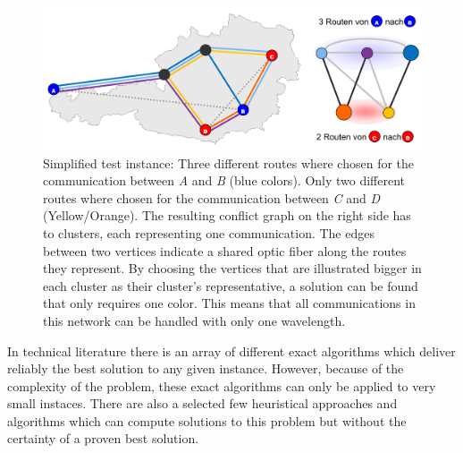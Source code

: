 \documentclass[paper=a4,fontsize=12pt]{scrartcl}
\begin{document}
\begin{figure}
    \includegraphics[width=1.0\textwidth]{../img/translation.pdf}
    \caption[Simplified test instance]{Simplified test instance: Three different routes where chosen for the communication between \emph{A} and \emph{B} (blue colors). Only two different routes where chosen for the communication between \emph{C} and \emph{D} (Yellow/Orange). The resulting conflict graph on the right side has to clusters, each representing one communication. The edges between two vertices indicate a shared optic fiber along the routes they represent. By choosing the vertices that are illustrated bigger in each cluster as their cluster's representative, a solution can be found that only requires one color. This means that all communications in this network can be handled with only one wavelength.}
    \label{fig:translation}
\end{figure}

In technical literature there is an array of different exact algorithms which deliver reliably the best solution to any given instance. However, because of the complexity of the problem, these exact algorithms can only be applied to very small instaces. There are also a selected few heuristical approaches and algorithms which can compute solutions to this problem but without the certainty of a proven best solution.
\end{document}

